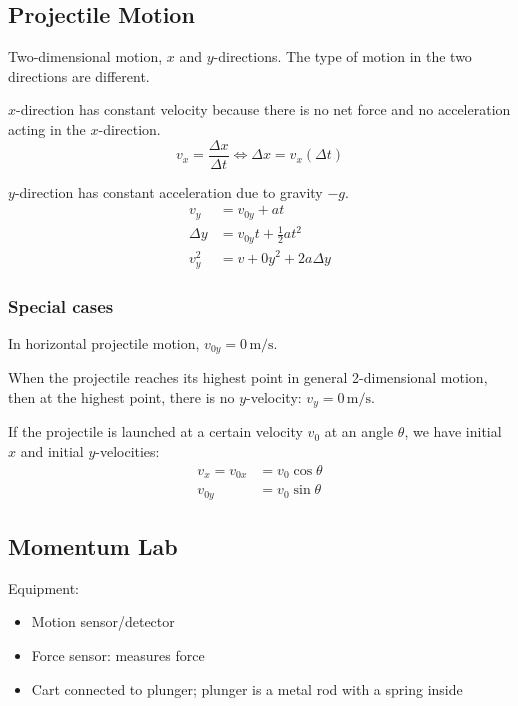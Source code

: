 \documentclass{article}
\begin{document}
\subsection{Projectile Motion}

Two-dimensional motion, $x$ and $y$-directions. The type of motion in the two directions are different.

$x$-direction has constant velocity because there is no net force and no acceleration acting in the $x$-direction.
\begin{equation*}
    v_x=\frac{\Delta x}{\Delta t}
	\iff \Delta x=v_x(\Delta t)
\end{equation*}

$y$-direction has constant acceleration due to gravity $-g$.
\begin{align*}
	v_y&=v_{0y}+at \\
	\Delta y&=v_{0y}t+\frac12at^2 \\
	v_y^2&=v+{0y}^2+2a\Delta y
\end{align*}

\subsubsection{Special cases}

In horizontal projectile motion, $v_{0y}=0\,\si{\meter\per\second}$.

When the projectile reaches its highest point in general 2-dimensional motion, then at the highest point, there is no $y$-velocity: $v_y=0\,\si{\meter\per\second}$.

If the projectile is launched at a certain velocity $v_0$ at an angle $\theta$, we have initial $x$ and initial $y$-velocities:
\begin{align*}
	v_x=v_{0x}&=v_0\cos\theta \\
	v_{0y}&=v_0\sin\theta
\end{align*}

\subsection{Momentum Lab}

Equipment:
\begin{itemize}
	\item Motion sensor/detector
	\item Force sensor: measures force
	\item Cart connected to plunger; plunger is a metal rod with a spring inside
\end{itemize}
\end{document}
